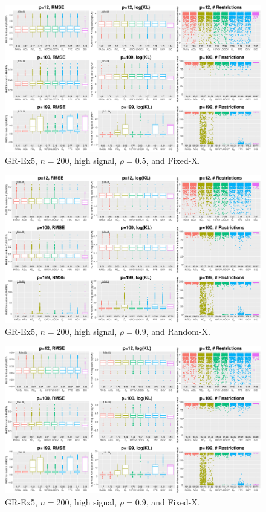 \begin{figure}[!ht]
\centering
\includegraphics[width=\textwidth]{figures/supplement/fixedx_GR-Ex5_n200_hsnr_rho05.eps}
\caption{GR-Ex5, $n=200$, high signal, $\rho=0.5$, and Fixed-X.}
\end{figure}
\clearpage
\begin{figure}[!ht]
\centering
\includegraphics[width=\textwidth]{figures/supplement/randomx_GR-Ex5_n200_hsnr_rho09.eps}
\caption{GR-Ex5, $n=200$, high signal, $\rho=0.9$, and Random-X.}
\end{figure}
\begin{figure}[!ht]
\centering
\includegraphics[width=\textwidth]{figures/supplement/fixedx_GR-Ex5_n200_hsnr_rho09.eps}
\caption{GR-Ex5, $n=200$, high signal, $\rho=0.9$, and Fixed-X.}
\end{figure}
